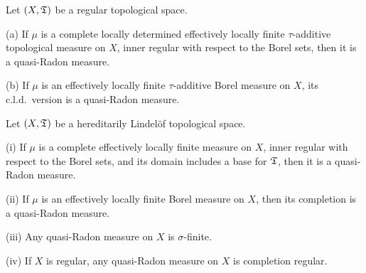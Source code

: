  Let $(X,\frak T)$ be a regular topological
space.

(a) If $\mu$ is a complete locally determined effectively locally finite
$\tau$-additive topological measure on $X$, inner regular with respect
to the Borel sets, then it is a quasi-Radon measure.

(b) If $\mu$ is an effectively locally finite $\tau$-additive Borel
measure on $X$, its c.l.d.\ version is a quasi-Radon measure.


 Let $(X,\frak T)$ be a hereditarily
Lindel\"of topological space.

(i) If $\mu$ is a complete effectively locally finite measure on $X$,
inner regular with respect to the Borel sets, and its domain includes
a base for $\frak T$, then it is a quasi-Radon measure.

(ii) If $\mu$ is an effectively locally finite Borel measure on $X$,
then its completion is a quasi-Radon measure.

(iii) Any quasi-Radon measure on $X$ is $\sigma$-finite.

(iv) If $X$ is regular, any quasi-Radon measure on $X$ is completion
regular.

